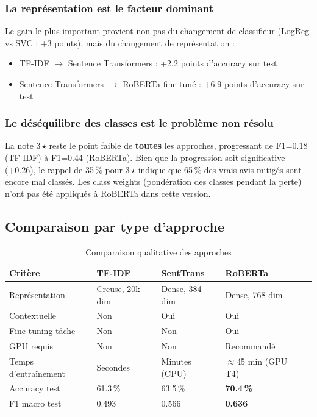 \documentclass[12pt, a4paper]{article}
\begin{document}
\subsubsection{La représentation est le facteur dominant}

Le gain le plus important provient non pas du changement de classifieur
(LogReg vs SVC : +3 points), mais du changement de représentation :
\begin{itemize}
  \item TF-IDF $\rightarrow$ Sentence Transformers : +2.2 points d'accuracy sur test
  \item Sentence Transformers $\rightarrow$ RoBERTa fine-tuné : +6.9 points d'accuracy sur test
\end{itemize}

\subsubsection{Le déséquilibre des classes est le problème non résolu}

La note 3\,$\star$ reste le point faible de \textbf{toutes} les approches,
progressant de F1=0.18 (TF-IDF) à F1=0.44 (RoBERTa). Bien que la progression
soit significative (+0.26), le rappel de 35\,\% pour 3\,$\star$ indique que
65\,\% des vrais avis mitigés sont encore mal classés. Les class weights
(pondération des classes pendant la perte) n'ont pas été appliqués
à RoBERTa dans cette version.

\subsection{Comparaison par type d'approche}

\begin{table}[H]
  \centering
  \begin{tabular}{lllll}
    \toprule
    \textbf{Critère} & \textbf{TF-IDF} & \textbf{SentTrans} & \textbf{RoBERTa} \\
    \midrule
    Représentation     & Creuse, 20k dim & Dense, 384 dim  & Dense, 768 dim \\
    Contextuelle       & Non             & Oui             & Oui \\
    Fine-tuning tâche  & Non             & Non             & Oui \\
    GPU requis         & Non             & Non             & Recommandé \\
    Temps d'entraînement & Secondes      & Minutes (CPU)   & $\approx$45 min (GPU T4) \\
    Accuracy test      & 61.3\,\%        & 63.5\,\%        & \textbf{70.4\,\%} \\
    F1 macro test      & 0.493           & 0.566           & \textbf{0.636} \\
    \bottomrule
  \end{tabular}
  \caption{Comparaison qualitative des approches}
\end{table}
\end{document}
